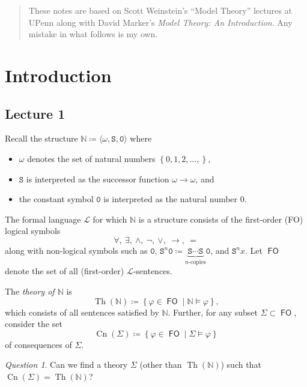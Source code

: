 \documentclass[10pt,letterpaper,cm]{nupset}
\theoremstyle{definition}
\theoremstyle{theorem}
\theoremstyle{remark}
\newtheorem*{question}{Question}
\newcommand{\N}{\mathbb N}
\renewcommand{\S}{\mathtt S}
\newcommand{\1}{\mathbf{1}}
\newcommand{\0}{\mathsf 0}
\DeclareMathOperator{\fo}{\mathsf{FO}}
\DeclareMathOperator{\thh}{Th}
\DeclareMathOperator{\cn}{Cn}
\begin{document}
\thispagestyle{empty}
\begin{abstract}
These notes are based on Scott Weinstein's ``Model Theory'' lectures at UPenn along with David Marker's \textit{Model Theory: An Introduction}. Any mistake in what follows is my own.
\end{abstract}

\tableofcontents
\newpage

\section{Introduction}
\subsection{Lecture 1}

Recall the structure $\N \coloneqq \langle \omega, \S, \mathtt{0}\rangle$ where 
\begin{itemize}
\item $\omega$ denotes the set of natural numbers $\left\{0,1,2,\ldots,\right\}$, 
\item $\S$ is interpreted as the successor function $\omega \to \omega$, and 
\item the constant symbol $\mathtt{0}$ is interpreted as the natural number $0$.
\end{itemize}

The formal language $\mathcal{L}$ for which $\N$ is a structure consists of the first-order (FO) logical symbols
\[
\forall, \ \exists, \ \land,\ \neg,\ \vee,\ \rightarrow, \ =
\]
along with non-logical symbols such as $\mathtt{0}$, $\S^n{\mathtt{0}}\coloneqq \underbrace{\S\cdots \S}_{n\text{-copies}}{\mathtt{0}}$, and $\S^n{x}$. Let $\fo$ denote the set of all (first-order) $\mathcal{L}$-sentences. 

\smallskip

The \textit{theory of $\N$} is 
\[
\thh(\N) \coloneqq \left\{\varphi \in \fo \mid \N \models \varphi \right\},
\] which consists of all sentences satisfied by $\N$. Further, for any subset $\Sigma \subset \fo$, consider the set $$\cn(\Sigma)  \coloneqq \left\{\varphi \in \fo \mid \Sigma \models \varphi\right\}$$ of consequences of $\Sigma$.

\begin{question}
Can we find a theory $\Sigma$ (other than $\thh(\N)$) such that $\cn(\Sigma) = \thh(\N)$?
\end{question}
\end{document}
